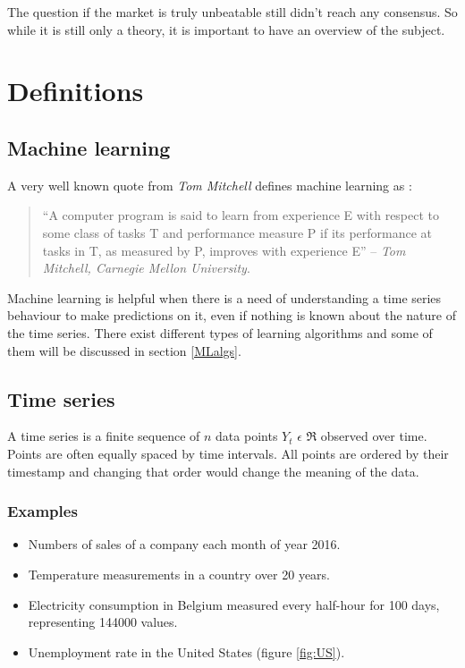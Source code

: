 \documentclass[11pt,a4paper,oneside]{book}
\newenvironment{myitemize}
{ \begin{itemize}
    \setlength\itemsep{0pt}}
{ \end{itemize}                  }
\begin{document}
The question if the market is truly unbeatable still didn't reach any consensus. So while it is still only a theory, it is important to have an overview of the subject. \cite{emh}


\section{Definitions}


\subsection{Machine learning}

A very well known quote from \textit{Tom Mitchell} defines machine learning as : 

\vspace*{\fill} 
\begin{quote} 
\centering 
``A computer program is said to learn from experience E with respect to some class of tasks T and performance measure P if its performance at tasks in T, as measured by P, improves with experience E'' -- \textit{Tom Mitchell, Carnegie Mellon University}. 
\end{quote}
\vspace*{\fill}


Machine learning is helpful when there is a need of understanding a time series behaviour to make predictions on it, even if nothing is known about the nature of the time series. There exist different types of learning algorithms and some of them will be discussed in section \ref{MLalgs}.


\subsection{Time series}

A time series is a finite sequence of $n$ data points $Y_{t}$ $\epsilon$ $\Re$ observed over time. Points are often equally spaced by time intervals. All points are ordered by their timestamp and changing that order would change the meaning of the data. \cite{hyndman}

\subsubsection{Examples}

\begin{myitemize}
    \item Numbers of sales of a company each month of year 2016.
    \item Temperature measurements in a country over 20 years.
    \item Electricity consumption in Belgium measured every half-hour for 100 days, representing 144000 values.
    \item Unemployment rate in the United States (figure \ref{fig:US}).
\end{myitemize}
\end{document}
